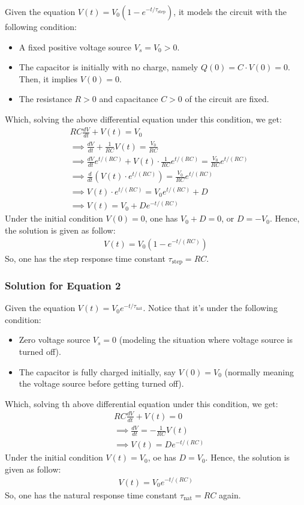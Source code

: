 \documentclass{article}
\begin{document}
Given the equation $V(t)=V_0(1-e^{-t/\tau_\text{step}})$, it models the circuit with the following condition:
\begin{itemize}
    \item A fixed positive voltage source $V_s=V_0>0$.
    \item The capacitor is initially with no charge, namely $Q(0) = C\cdot V(0)=0$. Then, it implies $V(0)=0$.
    \item The resistance $R>0$ and capacitance $C>0$ of the circuit are fixed.
\end{itemize}
Which, solving the above differential equation under this condition, we get:
\begin{align}
    &RC\frac{dV}{dt}+V(t)=V_0\\
    &\implies \frac{dV}{dt}+\frac{1}{RC}V(t)=\frac{V_0}{RC}\\
    &\implies \frac{dV}{dt}e^{t/(RC)}+V(t)\cdot \frac{1}{RC}e^{t/(RC)} = \frac{V_0}{RC}e^{t/(RC)}\\
    &\implies \frac{d}{dt}\left(V(t)\cdot e^{t/(RC)}\right)=\frac{V_0}{RC}e^{t/(RC)}\\
    &\implies V(t)\cdot e^{t/(RC)} = V_0e^{t/(RC)} + D\\
    &\implies V(t) = V_0+De^{-t/(RC)}
\end{align}
Under the initial condition $V(0)=0$, one has $V_0+D=0$, or $D=-V_0$. Hence, the solution is given as follow:
\begin{align}
    V(t)=V_0\left(1-e^{-t/(RC)}\right)
\end{align}
So, one has the step response time constant $\tau_\text{step} = RC$.

\hfil

\subsubsection{Solution for Equation 2}

Given the equation $V(t)=V_0e^{-t/\tau_\text{nat}}$. Notice that it's under the following condition:
\begin{itemize}
    \item Zero voltage source $V_s=0$ (modeling the situation where voltage source is turned off).
    \item The capacitor is fully charged initially, say $V(0)=V_0$ (normally meaning the voltage source before getting turned off).
\end{itemize}
Which, solving th above differential equation under this condition, we get:
\begin{align}
    &RC\frac{dV}{dt}+V(t)=0\\
    &\implies \frac{dV}{dt}=-\frac{1}{RC}V(t)\\
    &\implies V(t)=De^{-t/(RC)}
\end{align}
Under the initial condition $V(t)=V_0$, oe has $D=V_0$. Hence, the solution is given as follow:
\begin{align}
    V(t)=V_0e^{-t/(RC)}
\end{align}
So, one has the natural response time constant $\tau_\text{nat}=RC$ again.
\end{document}
